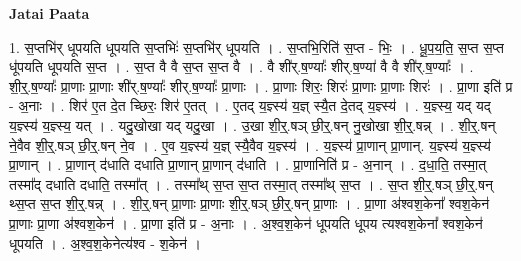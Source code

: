 \documentclass[17pt]{extarticle}
\begin{document}
\textbf{Jatai Paata} \newline

1. स॒प्तभि॑र् धूपयति धूपयति स॒प्तभिः॑ स॒प्तभि॑र् धूपयति । . स॒प्तभि॒रिति॑ स॒प्त - भिः॒ । . धू॒प॒य॒ति॒ स॒प्त स॒प्त धू॑पयति धूपयति स॒प्त । . स॒प्त वै वै स॒प्त स॒प्त वै । . वै शी॑र्.ष॒ण्याः᳚ शीर्.ष॒ण्या॑ वै वै शी॑र्.ष॒ण्याः᳚ । . शी॒र्॒.ष॒ण्याः᳚ प्रा॒णाः प्रा॒णाः शी॑र्.ष॒ण्याः᳚ शीर्.ष॒ण्याः᳚ प्रा॒णाः । . प्रा॒णाः शिरः॒ शिरः॑ प्रा॒णाः प्रा॒णाः शिरः॑ । . प्रा॒णा इति॑ प्र - अ॒नाः । . शिर॑ ए॒त दे॒त च्छिरः॒ शिर॑ ए॒तत् । . ए॒तद् य॒ज्ञ्स्य॑ य॒ज्ञ् स्यै॒त दे॒तद् य॒ज्ञ्स्य॑ । . य॒ज्ञ्स्य॒ यद् यद् य॒ज्ञ्स्य॑ य॒ज्ञ्स्य॒ यत् । . यदु॒खोखा यद् यदु॒खा । . उ॒खा शी॒र्॒.षञ् छी॒र्॒.षन् नु॒खोखा शी॒र्॒.षन्न् । . शी॒र्॒.षन् ने॒वैव शी॒र्॒.षञ् छी॒र्॒.षन् ने॒व । . ए॒व य॒ज्ञ्स्य॑ य॒ज्ञ् स्यै॒वैव य॒ज्ञ्स्य॑ । . य॒ज्ञ्स्य॑ प्रा॒णान् प्रा॒णान्. य॒ज्ञ्स्य॑ य॒ज्ञ्स्य॑ प्रा॒णान् । . प्रा॒णान् द॑धाति दधाति प्रा॒णान् प्रा॒णान् द॑धाति । . प्रा॒णानिति॑ प्र - अ॒नान् । . द॒धा॒ति॒ तस्मा॒त् तस्मा᳚द् दधाति दधाति॒ तस्मा᳚त् । . तस्मा᳚थ् स॒प्त स॒प्त तस्मा॒त् तस्मा᳚थ् स॒प्त । . स॒प्त शी॒र्॒.षञ् छी॒र्॒.षन् थ्स॒प्त स॒प्त शी॒र्॒.षन्न् । . शी॒र्॒.षन् प्रा॒णाः प्रा॒णाः शी॒र्॒.षञ् छी॒र्॒.षन् प्रा॒णाः । . प्रा॒णा अ॑श्वश॒केना᳚ श्वश॒केन॑ प्रा॒णाः प्रा॒णा अ॑श्वश॒केन॑ । . प्रा॒णा इति॑ प्र - अ॒नाः । . अ॒श्व॒श॒केन॑ धूपयति धूपय त्यश्वश॒केना᳚ श्वश॒केन॑ धूपयति । . अ॒श्व॒श॒केनेत्य॑श्व - श॒केन॑ । \newline
\end{document}
